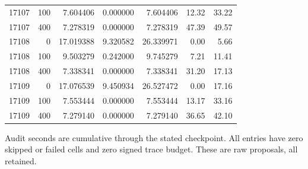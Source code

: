 \begin{table}[p]
\begin{tabular}{rrrrrrr}
17107 & 100 & 7.604406 & 0.000000 & 7.604406 & 12.32 & 33.22 \\
17107 & 400 & 7.278319 & 0.000000 & 7.278319 & 47.39 & 49.57 \\
17108 & 0 & 17.019388 & 9.320582 & 26.339971 & 0.00 & 5.66 \\
17108 & 100 & 9.503279 & 0.242000 & 9.745279 & 7.21 & 11.41 \\
17108 & 400 & 7.338341 & 0.000000 & 7.338341 & 31.20 & 17.13 \\
17109 & 0 & 17.076539 & 9.450934 & 26.527472 & 0.00 & 17.16 \\
17109 & 100 & 7.553444 & 0.000000 & 7.553444 & 13.17 & 33.16 \\
17109 & 400 & 7.279140 & 0.000000 & 7.279140 & 36.65 & 42.10 \\
\bottomrule\end{tabular}
\par\smallskip\footnotesize Audit seconds are cumulative through the stated checkpoint. All entries have zero skipped or failed cells and zero signed trace budget. These are raw proposals, all retained.
\end{table}

